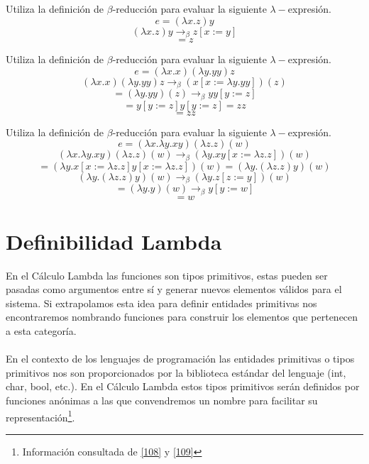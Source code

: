     \begin{exercise}
    Utiliza la definición de $\beta$-reducción para evaluar la siguiente $\lambda-$expresión.
    $$e= (\lambda x.z)y$$
    \[ (\lambda x.z)y \rightarrow_\beta  z [x := y]\]
    \[ = z \]
    \end{exercise}

    \begin{exercise}
        Utiliza la definición de $\beta$-reducción para evaluar la siguiente $\lambda-$expresión.
        $$e = (\lambda x.x)(\lambda y.yy) z$$
        \[ (\lambda x.x)(\lambda y.yy) z \rightarrow_\beta (x[x:=\lambda y.yy])(z)\]
        \[ = (\lambda y.yy)(z) \rightarrow_\beta yy[y:=z]\]
        \[ =  y[y:=z]y[y:=z] = zz\]
       \[= zz \]
    \end{exercise}

    \begin{exercise}
        Utiliza la definición de $\beta$-reducción para evaluar la siguiente $\lambda-$expresión.
        $$e= (\lambda x.\lambda y.xy)(\lambda z.z)(w)$$
        \[(\lambda x.\lambda y.xy)(\lambda z.z)(w) \rightarrow_\beta (\lambda y.xy[x := \lambda z.z])(w) \]
        \[ =  (\lambda y.x[x := \lambda z.z]y[x := \lambda z.z])(w) = (\lambda y.(\lambda z.z)y)(w) \]
        \[ (\lambda y.(\lambda z.z)y)(w) \rightarrow_\beta (\lambda y.z[z := y])(w) \]
        \[ = (\lambda y.y)(w) \rightarrow_\beta y[y := w] \]
        \[ = w \]
    \end{exercise}

    \section{Definibilidad Lambda}
    En el Cálculo Lambda las funciones son tipos primitivos, estas pueden ser pasadas como argumentos entre sí y generar nuevos elementos válidos para el sistema. Si extrapolamos esta idea para definir entidades primitivas nos encontraremos nombrando funciones para construir los elementos que pertenecen a esta categoría.\\\\
 En el contexto de los lenguajes de programación las entidades primitivas o tipos primitivos nos son proporcionados por la biblioteca estándar del lenguaje (\textsf{int}, \textsf{char}, \textsf{boo}l, etc.). En el Cálculo Lambda estos tipos primitivos serán definidos por funciones anónimas a las que convendremos un nombre para facilitar su representación\footnote{Información consultada de \hyperlink{108}{[108]} y  \hyperlink{109}{[109]}}.

